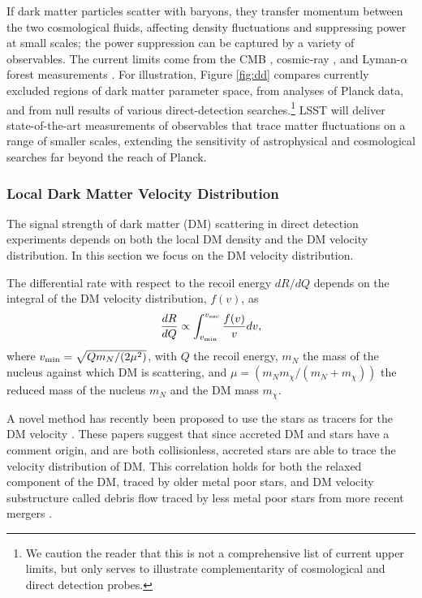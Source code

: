 If dark matter particles scatter with baryons, they transfer momentum between the two cosmological fluids, affecting density fluctuations and suppressing power at small scales; the power suppression can be captured by a variety of observables. The current limits come from the CMB \citep{Gluscevic:2017ywp}, cosmic-ray \citep{Cappiello:2018hsu}, and Lyman-$\alpha$ forest measurements \cite{Xu:2018efh}. For illustration, Figure \ref{fig:dd} compares currently excluded regions of dark matter parameter space, from analyses of Planck data, and from null results of various direct-detection searches.\footnote{We caution the reader that this is not a comprehensive list of current upper limits, but only serves to illustrate complementarity of cosmological and direct detection probes.} LSST will deliver state-of-the-art measurements of observables that trace matter fluctuations on a range of smaller scales, extending the sensitivity of astrophysical and cosmological searches far beyond the reach of Planck.

\subsubsection{Local Dark Matter Velocity Distribution }


The signal strength of dark matter (DM) scattering in direct detection experiments depends on both the local DM density and the DM velocity distribution. In this section we focus on the DM velocity distribution.

The differential rate with respect to the recoil energy $dR/dQ$ depends on the integral of the DM velocity distribution, $f(v)$, as
\begin{equation}
    \frac{dR}{dQ} \propto \int_{v_{\rm{min}}}^{v_{\rm{esc}}} \frac{f(v)}{v} dv, 
\end{equation}
where $v_{\rm{min}} = \sqrt{Q m_N/ (2 \mu^2)}$, with $Q$ the recoil energy, $m_N$ the mass of the nucleus against which DM is scattering, and $\mu = (m_N m_\chi / (m_N + m_\chi))$ the reduced mass of the nucleus $m_N$ and the DM mass $m_\chi$.

A novel method has recently been proposed to use the stars as tracers for the DM velocity \citep{Herzog-Arbeitman:2017fte,Necib:2018b}. These papers suggest that since accreted DM and stars have a comment origin, and are both collisionless, accreted stars are able to trace the velocity distribution of DM. This correlation holds for both the relaxed component of the DM, traced by older metal poor stars, and DM velocity substructure called debris flow traced by less metal poor stars from more recent mergers \citep{Lisanti:2011as,Kuhlen:2012fz,Lisanti:2014dva}. 

